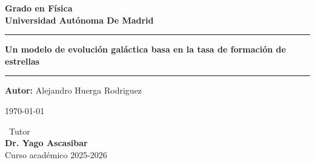 \documentclass[ a4paper,12pt]{article}
\def\titulo{Un modelo de evolución galáctica basa en la tasa de formación de estrellas}
\def\autor{Alejandro Huerga Rodriguez}
\def\institucion{Universidad Autónoma de Madrid}
\def\fecha{\today}
\begin{document}
	
	\begin{titlepage}
		\thispagestyle{empty} %
		\begin{center}
			
			
			\vspace{2cm}
			
			\textbf{\Large Grado en Física \\
				\vspace{0.5cm}
				Universidad Autónoma De Madrid}\\
			\vspace{3.0cm}
			
			
			\vspace{2cm}
			
			
			\rule{\linewidth}{0.8pt}
			
			\vspace{0.8cm} %
			
			{\Huge \textbf{\titulo}}
			
			\vspace{0.8cm} %
			
			\rule{\linewidth}{0.8pt}
			
			\vspace{2cm}
			
			{\Large \textbf{Autor:} \autor}
			
			\vspace{3cm}
			
			{\Large \fecha}
			
			\vspace{3.5cm}
			{\large\ Tutor\\
				\vspace{0.5cm}
				\textbf{Dr. Yago Ascasibar}}\\
			\vspace{0.5cm}
			{\large Curso académico 2025-2026}
			
		\end{center}
	\end{titlepage}
	
\end{document}
